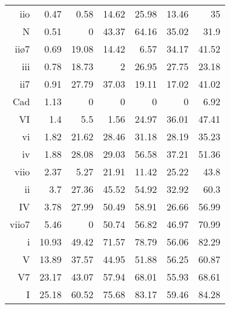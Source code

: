 \begin{tabular}{rrrrrrr}
iio       & 0.47       & 0.58    & 14.62              & 25.98                & 13.46                       & 35                   \\
N         & 0.51       & 0       & 43.37              & 64.16                & 35.02                       & 31.9                 \\
iiø7      & 0.69       & 19.08   & 14.42              & 6.57                 & 34.17                       & 41.52                \\
iii       & 0.78       & 18.73   & 2                  & 26.95                & 27.75                       & 23.18                \\
ii7       & 0.91       & 27.79   & 37.03              & 19.11                & 17.02                       & 41.02                \\
Cad       & 1.13       & 0       & 0                  & 0                    & 0                           & 6.92                 \\
VI        & 1.4        & 5.5     & 1.56               & 24.97                & 36.01                       & 47.41                \\
vi        & 1.82       & 21.62   & 28.46              & 31.18                & 28.19                       & 35.23                \\
iv        & 1.88       & 28.08   & 29.03              & 56.58                & 37.21                       & 51.36                \\
viio      & 2.37       & 5.27    & 21.91              & 11.42                & 25.22                       & 43.8                 \\
ii        & 3.7        & 27.36   & 45.52              & 54.92                & 32.92                       & 60.3                 \\
IV        & 3.78       & 27.99   & 50.49              & 58.91                & 26.66                       & 56.99                \\
viio7     & 5.46       & 0       & 50.74              & 56.82                & 46.97                       & 70.99                \\
i         & 10.93      & 49.42   & 71.57              & 78.79                & 56.06                       & 82.29                \\
V         & 13.89      & 37.57   & 44.95              & 51.88                & 56.25                       & 60.87                \\
V7        & 23.17      & 43.07   & 57.94              & 68.01                & 55.93                       & 68.61                \\
I         & 25.18      & 60.52   & 75.68              & 83.17                & 59.46                       & 84.28               
\end{tabular}
